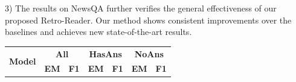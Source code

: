 \documentclass[letterpaper]{article} %
\begin{document}
3) The results on NewsQA further verifies the general
effectiveness of our proposed Retro-Reader. Our method shows consistent improvements over the baselines and achieves new state-of-the-art results.







\begin{table}
	\begin{center}
		\setlength{\tabcolsep}{5pt}
		{
			\begin{tabular}{lllllll}
				\toprule
				\multirow{2}{*}{\textbf{Model}} & \multicolumn{2}{c}{\textbf{All}} & \multicolumn{2}{c}{\textbf{HasAns}} & \multicolumn{2}{c}{\textbf{NoAns}} \\
				& \textbf{EM} & \textbf{F1} & \textbf{EM} & \textbf{F1} & \textbf{EM} & \textbf{F1} \\


\end{tabular}}
\end{center}
\end{table}
\end{document}
